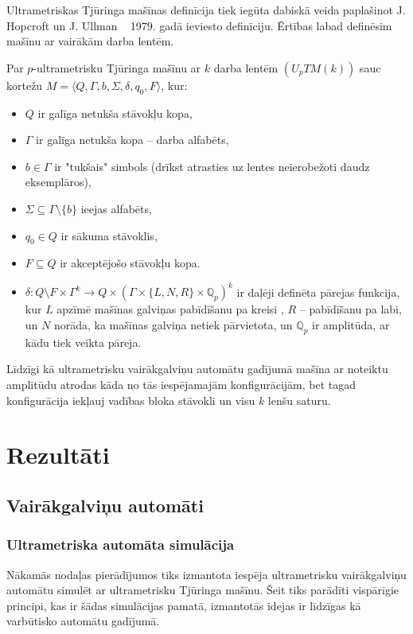 \documentclass{ludis}
\begin{document}

Ultrametriskas Tjūringa mašīnas definīcija tiek iegūta dabiskā veida paplašinot J. Hopcroft un J. Ullman ~\citep{Hopcroft1979} 1979. gadā ieviesto definīciju. Ērtības labad definēsim mašīnu ar vairākām darba lentēm.
\begin{definicija}
Par $p$-ultrametrisku Tjūringa mašīnu ar $k$ darba lentēm $(U_pTM(k))$ sauc kortežu $M= \langle Q, \Gamma, b, \Sigma, \delta, q_0, F \rangle$, kur:
\begin{itemize}
	\item $Q$ ir galīga netukša stāvokļu kopa,
	\item $\Gamma$ ir galīga netukša kopa -- darba alfabēts,
	\item $b \in \Gamma$ ir "tukšais" simbols (drīkst atrasties uz lentes neierobežoti daudz eksemplāros),
	\item $\Sigma\subseteq\Gamma\setminus\{b\}$ ieejas alfabēts,
	\item $q_0 \in Q$ ir sākuma stāvoklis,
	\item $F \subseteq Q$ ir akceptējošo stāvokļu kopa.
	\item $\delta: Q \setminus F \times \Gamma^k \rightarrow Q \times \left(\Gamma \times \{L,N,R\} \times \mathbb{Q}_p \right)^k$ ir daļēji definēta pārejas funkcija, kur $L$ apzīmē mašīnas galviņas pabīdīšanu pa kreisi , $R$ -- pabīdīšanu pa labi, un $N$ norāda, ka mašīnas galviņa netiek pārvietota, un $\mathbb{Q}_p$ ir amplitūda, ar kādu tiek veikta pāreja.
\end{itemize}
\end{definicija}

Līdzīgi kā ultrametrisku vairākgalviņu automātu gadījumā mašīna ar noteiktu amplitūdu atrodas kāda no tās iespējamajām konfigurācijām, bet tagad konfigurācija iekļauj vadības bloka stāvokli un visu $k$ lenšu saturu.


\chapter {Rezultāti}
\section {Vairākgalviņu automāti}
\subsection{Ultrametriska automāta simulācija}
Nākamās nodaļas pierādījumos tiks izmantota iespēja ultrametrisku vairākgalviņu automātu simulēt ar ultrametrisku Tjūringa mašīnu. Šeit tiks parādīti vispārīgie principi, kas ir šādas simulācijas pamatā, izmantotās idejas ir līdzīgas kā ~\citep{Macarie1995} varbūtisko automātu gadījumā.
\end{document}

